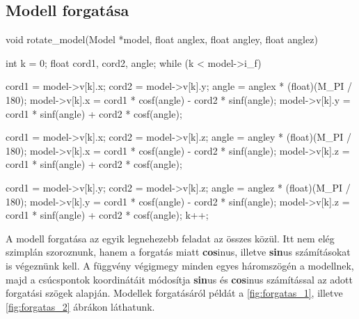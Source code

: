 \newpage
\subsection{Modell forgatása}

\begin{cpp}
void rotate_model(Model *model, float anglex, float angley, float anglez)
{
    int k = 0;
    float cord1, cord2, angle;
    while (k < model->i_f)
    {
        cord1 = model->v[k].x;
        cord2 = model->v[k].y;
        angle = anglex * (float)(M_PI / 180);
        model->v[k].x = cord1 * cosf(angle) - cord2 * sinf(angle);
        model->v[k].y = cord1 * sinf(angle) + cord2 * cosf(angle);
			
        cord1 = model->v[k].x;
        cord2 = model->v[k].z;
        angle = angley * (float)(M_PI / 180);
        model->v[k].x = cord1 * cosf(angle) - cord2 * sinf(angle);
        model->v[k].z = cord1 * sinf(angle) + cord2 * cosf(angle);
			
        cord1 = model->v[k].y;
        cord2 = model->v[k].z;
        angle = anglez * (float)(M_PI / 180);
        model->v[k].y = cord1 * cosf(angle) - cord2 * sinf(angle);
        model->v[k].z = cord1 * sinf(angle) + cord2 * cosf(angle);
        k++;
    }
}
\end{cpp}

A modell forgatása az egyik legnehezebb feladat az összes közül. Itt nem elég szimplán szoroznunk, hanem a forgatás miatt \textbf{cos}inus, illetve \textbf{sin}us számításokat is végeznünk kell. A függvény végigmegy minden egyes háromszögén a modellnek, majd a csúcspontok koordinátáit módosítja \textbf{sin}us és \textbf{cos}inus számítással az adott forgatási szögek alapján. Modellek forgatásáról példát a \ref{fig:forgatas_1}, illetve \ref{fig:forgatas_2} ábrákon láthatunk.

\newpage

